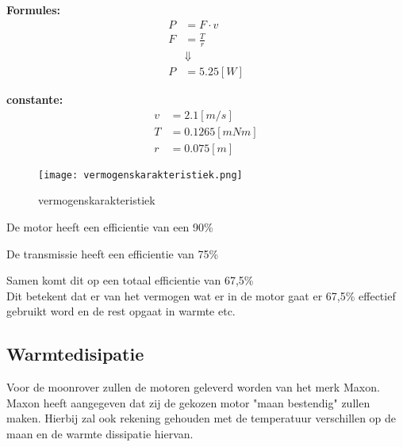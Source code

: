\begin{multicols}{2}
        \textbf{Formules:}
        \begin{equation}
            \begin{split}
                P &= F \cdot v \\
                F &= \frac{T}{r} \\
                &\Downarrow \\
                P &= 5.25 [W]
            \end{split}
        \end{equation}

        \textbf{constante:}
        \begin{equation*}
            \begin{split}
                v &= 2.1 [m/s] \\
                T &= 0.1265[mNm]  \\
                r &= 0.075[m]
            \end{split}
        \end{equation*}
    \end{multicols}

    \begin{figure}[H]
        \centering
        \texttt{[image: vermogenskarakteristiek.png]}
        \caption{vermogenskarakteristiek}
        \label{fig:vermogenskarakteristiek}
        \end{figure}

De motor heeft een efficientie van een 90\%

De transmissie heeft een efficientie van 75\%

Samen komt dit op een totaal efficientie van 67,5\% \\
Dit betekent dat er van het vermogen wat er in de motor gaat er 67,5\% effectief gebruikt word en de rest opgaat in warmte etc.

\subsection{Warmtedisipatie}

Voor de moonrover zullen de motoren geleverd worden van het merk Maxon. Maxon heeft aangegeven dat zij de gekozen motor "maan bestendig" zullen maken. Hierbij zal ook rekening gehouden met de temperatuur verschillen op de maan en de warmte dissipatie hiervan. 